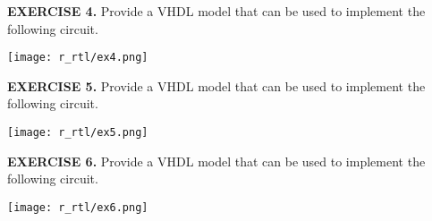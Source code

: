 \vspace{20pt}
\noindent
\begin{minipage}[t]{0.5\textwidth}
\textbf{EXERCISE 4.}
Provide a VHDL model that can be used to implement the following circuit.
\end{minipage}
\begin{minipage}[t]{0.47\textwidth}
\vspace{0pt}\raggedright
\centering
\texttt{[image: r\_rtl/ex4.png]}
\end{minipage}

\vspace{20pt}
\noindent
\begin{minipage}[t]{0.5\textwidth}
\textbf{EXERCISE 5.}
Provide a VHDL model that can be used to implement the following circuit.
\end{minipage}
\begin{minipage}[t]{0.47\textwidth}
\vspace{0pt}\raggedright
\centering
\texttt{[image: r\_rtl/ex5.png]}
\end{minipage}

\vspace{20pt}
\noindent
\begin{minipage}[t]{0.5\textwidth}
\textbf{EXERCISE 6.}
Provide a VHDL model that can be used to implement the following circuit.
\end{minipage}
\begin{minipage}[t]{0.47\textwidth}
\vspace{0pt}\raggedright
\centering
\texttt{[image: r\_rtl/ex6.png]}
\end{minipage}




